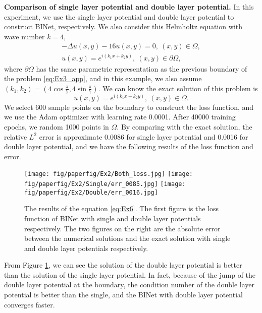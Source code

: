\documentclass[hyperref]{article}
\numberwithin{equation}{section}
\theoremstyle{nonumberplain}
\begin{document}
	\textbf{Comparison of single layer potential and double layer potential.} In this experiment, we use the single layer potential and double layer potential to construct BINet, respectively. We also consider this Helmholtz equation with wave number $k=4$,
	\begin{equation}
		\begin{aligned}
			-\Delta u(x,y) - 16u(x,y) = 0,\ (x,y)\in\Omega,\\
			u(x,y) = e^{i(k_1x+k_2y)}, \ (x,y)\in\partial\Omega,
		\end{aligned}
		\label{eq:Ex6}
	\end{equation}
	where $\partial\Omega$ has the same parametric representation as the previous boundary of the problem \eqref{eq:Ex3_app}, and in this example, we also assume $(k_1,k_2)=(4\cos\frac{\pi}{7},4\sin\frac{\pi}{7})$.
	We can know the exact solution of this problem is 
	\begin{equation*}
		u(x,y) = e^{i(k_1x+k_2y)}, \ (x,y)\in\Omega.
	\end{equation*}
	We select 600 sample points on the boundary to construct the loss function, and we use the Adam optimizer with learning rate 0.0001. After 40000 training epochs, we random 1000 points in $\Omega$. By comparing with the exact solution, the relative $L^2$ error is approximate 0.0086 for single layer potential and 0.0016 for double layer potential, and we have the following results of the loss function and error.
	\noindent
	\begin{figure}[t]
		\centering
		\texttt{[image: fig/paperfig/Ex2/Both\_loss.jpg]}
		\texttt{[image: fig/paperfig/Ex2/Single/err\_0085.jpg]}
		\texttt{[image: fig/paperfig/Ex2/Double/err\_0016.jpg]}
		\caption{The results of the equation \eqref{eq:Ex6}. The first figure is the loss function of BINet with single and double layer potentials respectively. The two figures on the right are the absolute error between the numerical solutions and the exact solution with single and double layer potentials respectively. }
		\label{fig:ex6}
	\end{figure}
	From Figure \ref{fig:ex6}, we can see the solution of the double layer potential is better than the solution of the single layer potential. In fact, because of the jump of the double layer potential at the boundary, the condition number of the double layer potential is better than the single, and the BINet with double layer potential converges faster. 
	
	
	
\end{document}
